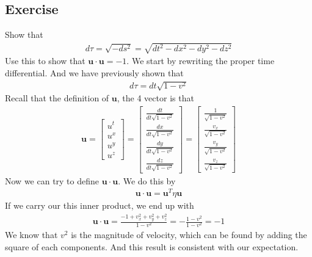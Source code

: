 \documentclass[12pt]{memoir}
\begin{document}
            \subsection{Exercise}
                Show that
                \begin{align}
                d\tau = \sqrt{-ds^2} = \sqrt{dt^2 - dx^2 - dy^2 - dz^2}
                \end{align}
                Use this to show that $\mathbf{u}\cdot\mathbf{u} = -1$. 
                We start by rewriting the proper time differential. And we have previously shown that
                \begin{align}
                d\tau = dt\sqrt{1-v^2}
                \end{align}
                Recall that the definition of $\mathbf{u}$, the 4 vector is that 
                \begin{align}
                \mathbf{u}= 
                \begin{bmatrix}
                u^t \\
                u^x \\
                u^y \\
                u^z
                \end{bmatrix}
                =
                \begin{bmatrix}
                \frac{dt}{dt\sqrt{1 - v^2}} \\
                \frac{dx}{dt\sqrt{1 - v^2}} \\
                \frac{dy}{dt\sqrt{1 - v^2}} \\
                \frac{dz}{dt\sqrt{1 - v^2}}
                \end{bmatrix}
                =
                \begin{bmatrix}
                \frac{1}{\sqrt{1 - v^2}} \\
                \frac{v_x}{\sqrt{1 - v^2}} \\
                \frac{v_y}{\sqrt{1 - v^2}} \\
                \frac{v_z}{\sqrt{1 - v^2}}
                \end{bmatrix}
                \end{align}
            Now we can try to define $\mathbf{u}\cdot\mathbf{u}$. We do this by
            \begin{align}
            \mathbf{u}\cdot\mathbf{u}= \mathbf{u}^T\eta \mathbf{u}
            \end{align}
            If we carry our this inner product, we end up with
            \begin{align}
            \mathbf{u}\cdot\mathbf{u} = \frac{-1 + v_x^2+v_y^2+v_z^2}{1-v^2} = -\frac{1-v^2}{1-v^2} = -1
            \end{align}
            We know that $v^2$ is the magnitude of velocity, which can be found by adding the square of each components. And this result is consistent with our expectation.
\end{document}
